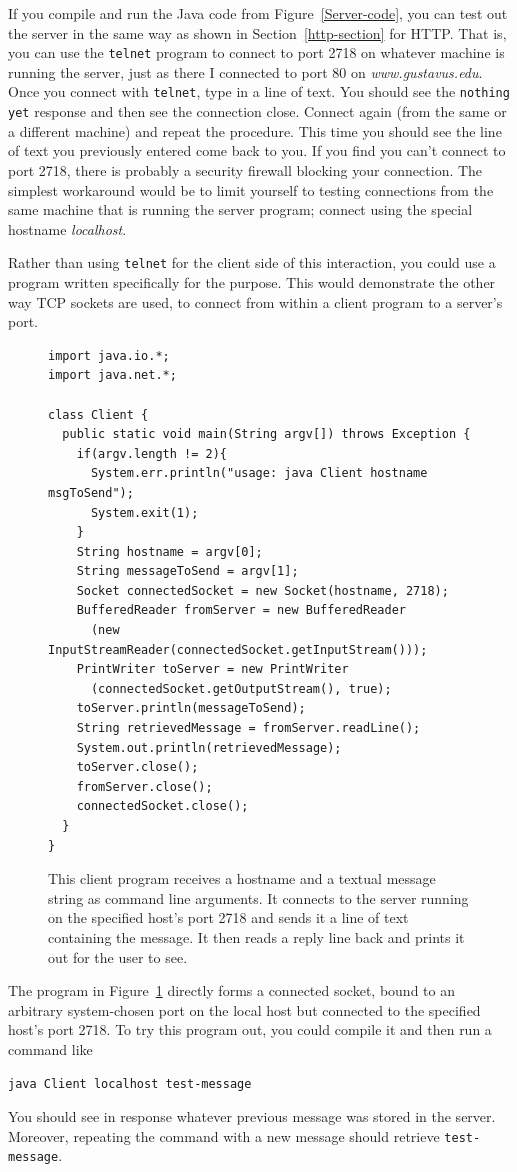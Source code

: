 If you compile and run the Java code from Figure~\ref{Server-code},
you can test out the server in the same way as shown in
Section~\ref{http-section} for HTTP.  That is, you can use the
\verb|telnet| program to connect to port 2718 on whatever machine is
running the server, just as there I connected to port 80 on
\textit{www.gustavus.edu}.  Once you connect with \verb|telnet|, type in a line
of text.  You should see the {\tt nothing yet} response and then see the
connection close.  Connect again (from the same or a different
machine) and repeat the procedure.  This time you should see the line
of text you previously entered come back to you.  If you find you can't
connect to port 2718, there is probably a security firewall blocking your
connection.  The simplest workaround would be to limit yourself to testing
connections from the same machine that is running the server program; connect
using the special hostname \textit{localhost}.

Rather than using \verb|telnet| for the client side of this
interaction, you could use a program written specifically for the
purpose.  This would demonstrate the other way TCP sockets are used,
to connect from within a client program to a server's port.
\begin{figure}
\begin{verbatim}
import java.io.*;
import java.net.*;

class Client {
  public static void main(String argv[]) throws Exception {
    if(argv.length != 2){
      System.err.println("usage: java Client hostname msgToSend");
      System.exit(1);
    }
    String hostname = argv[0];
    String messageToSend = argv[1];
    Socket connectedSocket = new Socket(hostname, 2718);
    BufferedReader fromServer = new BufferedReader
      (new InputStreamReader(connectedSocket.getInputStream()));
    PrintWriter toServer = new PrintWriter
      (connectedSocket.getOutputStream(), true);
    toServer.println(messageToSend);
    String retrievedMessage = fromServer.readLine();
    System.out.println(retrievedMessage);
    toServer.close();
    fromServer.close();
    connectedSocket.close();
  }
}
\end{verbatim}
\caption{This client program receives a hostname and a
  textual message string as command line arguments. It connects to the server running on the
  specified host's port 2718 and sends it a line of text containing
  the message.  It then reads a reply line back and prints it out for
  the user to see.}
\label{Client-code}
\end{figure}
The program in Figure~\ref{Client-code} directly forms a connected socket, bound to an arbitrary
system-chosen port on the local host but connected to the specified
host's port 2718.  To try this program out, you could compile it and
then run a command like
\begin{verbatim}
java Client localhost test-message
\end{verbatim}
You should see in response whatever previous message was stored in the
server.  Moreover, repeating the command with a new message should
retrieve \verb|test-message|.

